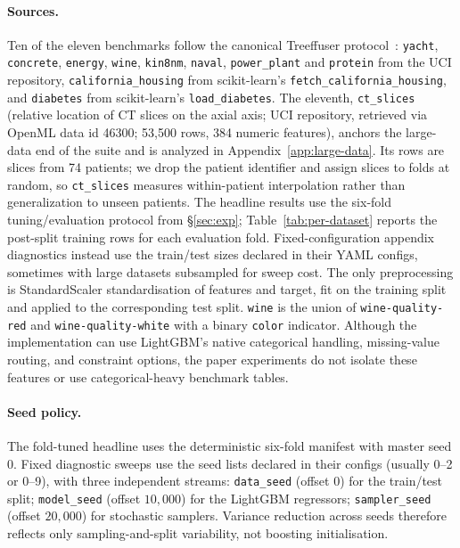 \documentclass{article}
\begin{document}
\paragraph{Sources.} Ten of the eleven benchmarks follow the canonical Treeffuser protocol~\citep{treeffuser}: \texttt{yacht}, \texttt{concrete}, \texttt{energy}, \texttt{wine}, \texttt{kin8nm}, \texttt{naval}, \texttt{power\_plant} and \texttt{protein} from the UCI repository, \texttt{california\_housing} from scikit-learn's \texttt{fetch\_california\_housing}, and \texttt{diabetes} from scikit-learn's \texttt{load\_diabetes}. The eleventh, \texttt{ct\_slices}~\citep{graf2011ctslices} (relative location of CT slices on the axial axis; UCI repository, retrieved via OpenML data id 46300; 53{,}500 rows, 384 numeric features), anchors the large-data end of the suite and is analyzed in Appendix~\ref{app:large-data}. Its rows are slices from 74 patients; we drop the patient identifier and assign slices to folds at random, so \texttt{ct\_slices} measures within-patient interpolation rather than generalization to unseen patients. The headline results use the six-fold tuning/evaluation protocol from \S\ref{sec:exp}; Table~\ref{tab:per-dataset} reports the post-split training rows for each evaluation fold. Fixed-configuration appendix diagnostics instead use the train/test sizes declared in their YAML configs, sometimes with large datasets subsampled for sweep cost. The only preprocessing is StandardScaler standardisation of features and target, fit on the training split and applied to the corresponding test split. \texttt{wine} is the union of \texttt{wine-quality-red} and \texttt{wine-quality-white} with a binary \texttt{color} indicator. Although the implementation can use LightGBM's native categorical handling, missing-value routing, and constraint options, the paper experiments do not isolate these features or use categorical-heavy benchmark tables.

\paragraph{Seed policy.} The fold-tuned headline uses the deterministic six-fold manifest with master seed 0. Fixed diagnostic sweeps use the seed lists declared in their configs (usually 0--2 or 0--9), with three independent streams: \texttt{data\_seed} (offset 0) for the train/test split; \texttt{model\_seed} (offset $10{,}000$) for the LightGBM regressors; \texttt{sampler\_seed} (offset $20{,}000$) for stochastic samplers. Variance reduction across seeds therefore reflects only sampling-and-split variability, not boosting initialisation.
\end{document}
